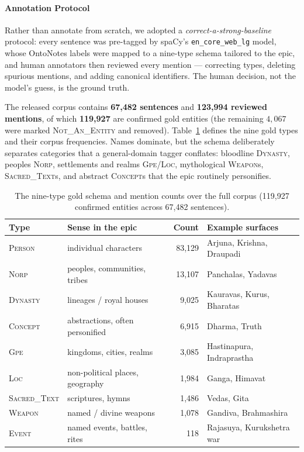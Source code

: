 \documentclass[conference]{IEEEtran}
\begin{document}
\paragraph{Annotation Protocol}
Rather than annotate from scratch, we adopted a \emph{correct-a-strong-baseline} protocol: every sentence was pre-tagged by spaCy's \texttt{en\_core\_web\_lg} model, whose OntoNotes labels were mapped to a nine-type schema tailored to the epic, and human annotators then reviewed every mention --- correcting types, deleting spurious mentions, and adding canonical identifiers. The human decision, not the model's guess, is the ground truth.

The released corpus contains \textbf{67{,}482 sentences} and \textbf{123{,}994 reviewed mentions}, of which \textbf{119{,}927} are confirmed gold entities (the remaining $4{,}067$ were marked \textsc{Not\_An\_Entity} and removed). Table~\ref{tab:schema} defines the nine gold types and their corpus frequencies. Names dominate, but the schema deliberately separates categories that a general-domain tagger conflates: bloodline \textsc{Dynasty}, peoples \textsc{Norp}, settlements and realms \textsc{Gpe}/\textsc{Loc}, mythological \textsc{Weapon}s, \textsc{Sacred\_Text}s, and abstract \textsc{Concept}s that the epic routinely personifies.

\begin{table}[!t]
\centering
\caption{The nine-type gold schema and mention counts over the full corpus (119{,}927 confirmed entities across 67{,}482 sentences).}
\label{tab:schema}
\small
\begin{tabularx}{\textwidth}{@{}l l r X@{}}
\toprule
\textbf{Type} & \textbf{Sense in the epic} & \textbf{Count} & \textbf{Example surfaces} \\
\midrule
\textsc{Person}       & individual characters                 & 83{,}129 & Arjuna, Krishna, Draupadi \\
\textsc{Norp}         & peoples, communities, tribes          & 13{,}107 & Panchalas, Yadavas \\
\textsc{Dynasty}      & lineages / royal houses               & 9{,}025  & Kauravas, Kurus, Bharatas \\
\textsc{Concept}      & abstractions, often personified       & 6{,}915  & Dharma, Truth \\
\textsc{Gpe}          & kingdoms, cities, realms              & 3{,}085  & Hastinapura, Indraprastha \\
\textsc{Loc}          & non-political places, geography       & 1{,}984  & Ganga, Himavat \\
\textsc{Sacred\_Text} & scriptures, hymns                     & 1{,}486  & Vedas, Gita \\
\textsc{Weapon}       & named / divine weapons                & 1{,}078  & Gandiva, Brahmashira \\
\textsc{Event}        & named events, battles, rites          & 118      & Rajasuya, Kurukshetra war \\
\bottomrule
\end{tabularx}
\end{table}
\end{document}
